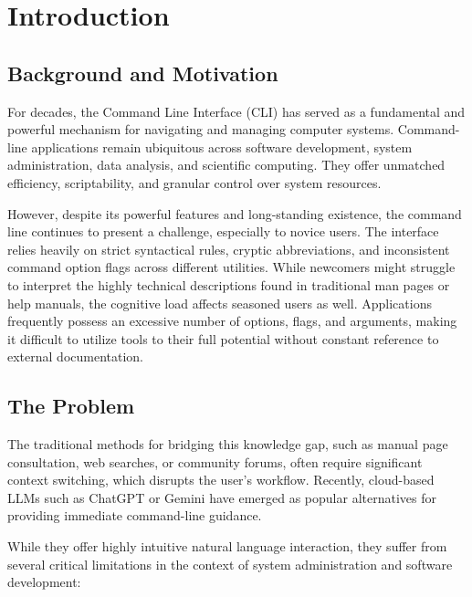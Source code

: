\section{Introduction}

\subsection{Background and Motivation}

For decades, the Command Line Interface (CLI) has served as a fundamental and powerful mechanism for navigating and managing computer systems. Command-line applications remain ubiquitous across software development, system administration, data analysis, and scientific computing. They offer unmatched efficiency, scriptability, and granular control over system resources.

However, despite its powerful features and long-standing existence, the command line continues to present a challenge, especially to novice users. The interface relies heavily on strict syntactical rules, cryptic abbreviations, and inconsistent command option flags across different utilities. While newcomers might struggle to interpret the highly technical descriptions found in traditional man pages or help manuals, the cognitive load affects seasoned users as well. Applications frequently possess an excessive number of options, flags, and arguments, making it difficult to utilize tools to their full potential without constant reference to external documentation. 

\subsection{The Problem}\label{sec:theProblem}

The traditional methods for bridging this knowledge gap, such as manual page consultation, web searches, or community forums, often require significant context switching, which disrupts the user's workflow. Recently, cloud-based \acp{LLM} such as ChatGPT or Gemini have emerged as popular alternatives for providing immediate command-line guidance.

While they offer highly intuitive natural language interaction, they suffer from several critical limitations in the context of system administration and software development:


